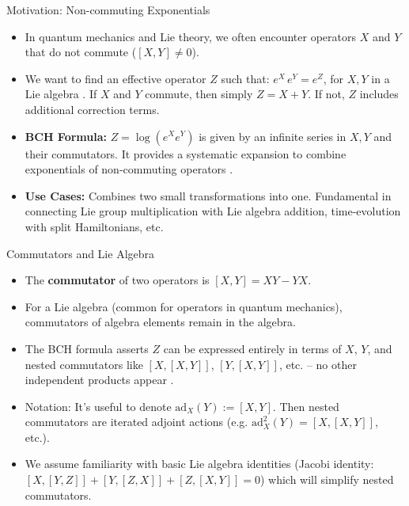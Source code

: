 \documentclass{beamer}
\begin{document}
\begin{frame}{Motivation: Non-commuting Exponentials}
\begin{itemize}
\item In quantum mechanics and Lie theory, we often encounter operators $X$ and $Y$ that do not commute ($[X,Y] \neq 0$).
\item We want to find an effective operator $Z$ such that:
$e^{X} \, e^{Y} = e^{Z}$,
for $X,Y$ in a Lie algebra . If $X$ and $Y$ commute, then simply $Z=X+Y$. If not, $Z$ includes additional correction terms.
\item \textbf{BCH Formula:} $Z = \log(e^X e^Y)$ is given by an infinite series in $X, Y$ and their commutators. It provides a systematic expansion to combine exponentials of non-commuting operators .
\item \textbf{Use Cases:} Combines two small transformations into one. Fundamental in connecting Lie group multiplication with Lie algebra addition, time-evolution with split Hamiltonians, etc.
\end{itemize}
\end{frame}

\begin{frame}{Commutators and Lie Algebra}
\begin{itemize}
\item The \textbf{commutator} of two operators is $[X,Y] = XY - YX$. 
\item For a Lie algebra (common for operators in quantum mechanics), commutators of algebra elements remain in the algebra.
\item The BCH formula asserts $Z$ can be expressed entirely in terms of $X$, $Y$, and nested commutators like $[X,[X,Y]]$, $[Y,[X,Y]]$, etc. – no other independent products appear .
\item Notation: It’s useful to denote $\mathrm{ad}_X(Y) := [X,Y]$. Then nested commutators are iterated adjoint actions (e.g. $\mathrm{ad}_X^2(Y) = [X,[X,Y]]$, etc.).
\item We assume familiarity with basic Lie algebra identities (Jacobi identity: $[X,[Y,Z]] + [Y,[Z,X]] + [Z,[X,Y]] = 0$) which will simplify nested commutators.
\end{itemize}
\end{frame}
\end{document}
